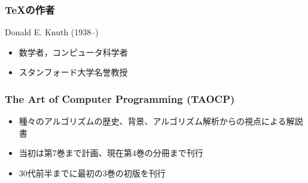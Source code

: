 \documentclass[dvipdfmx]{beamer}
\begin{document}
\begin{frame}
    \frametitle{\TeX の作者}
    Donald E. Knuth (1938--)
    \begin{itemize}
        \item 数学者，コンピュータ科学者
        \item スタンフォード大学名誉教授
    \end{itemize}
\end{frame}

\begin{frame}
    \frametitle{The Art of Computer Programming (TAOCP) \cite{taocp}}
    \large
    \begin{itemize}
        \item 種々のアルゴリズムの歴史、背景、アルゴリズム解析からの視点による解説書
        \item 当初は第7巻まで計画、現在第4巻の分冊まで刊行
        \item 30代前半までに最初の3巻の初版を刊行
    \end{itemize}
\end{frame}
\end{document}
